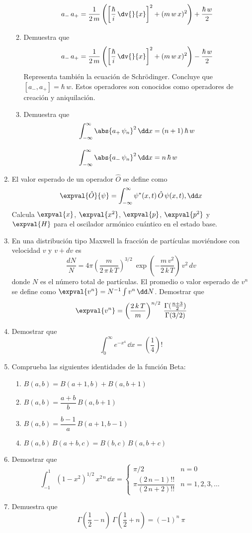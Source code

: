 \begin{enumerate}
\begin{enumerate}[label=\roman*)]
\[ a_{-} \, a_{+} = \dfrac{1}{2 \, m} \left( \left[ \dfrac{\hbar}{i} \, \dv{}{x} \right]^{2} + (m \, w \, x)^{2} \right) + \dfrac{\hbar \, w}{2} \]
\item Demuestra que
\[ a_{-} \, a_{+} = \dfrac{1}{2 \, m} \left( \left[ \dfrac{\hbar}{i} \, \dv{}{x} \right]^{2} + (m \, w \, x)^{2} \right) - \dfrac{\hbar \, w}{2} \]
Representa también la ecuación de Schrödinger. Concluye que $[a_{-}, a_{+}] = \hbar \, w$. Estos operadores son conocidos como operadores de creación y aniquilación.
\item Demuestra que
\begin{align*}
\int_{-\infty}^{\infty} \abs{a_{+} \, \psi_{n}}^{2} \, \dd x &= (n+1) \, \hbar \, w \\[1em]
\int_{-\infty}^{\infty} \abs{a_{-} \, \psi_{n}}^{2} \, \dd x &= n \, \hbar \, w
\end{align*}
\end{enumerate}
\item El valor esperado de un operador $\hat{O}$ se define como
\[ \expval{\hat{O}}{\psi} = \int_{-\infty}^{\infty} \psi^{*} (x, t) \, \hat{O} \, \psi (x, t) , \dd x  \]
Calcula $\expval{x}$, $\expval{x^{2}}$, $\expval{p}$, $\expval{p^{2}}$ y $\expval{H}$ para el oscilador armónico cuántico en el estado base.
\item En una distribución tipo Maxwell la fracción de partículas moviéndose con velocidad $v$ y $v+dv$ es
\[ \dfrac{dN}{N} = 4 \pi \left( \dfrac{m}{2 \, \pi \, k \, T} \right)^{3/2} \: \exp \left( - \dfrac{m \, v^{2}}{2 \, k \, T} \right) \, v^{2} \, dv \]
donde $N$ es el número total de partículas. El promedio o valor esperado de $v^{n}$ se define como $\expval{v^{n}} = N^{-1} \int v^{n} \, \dd N$. Demostrar que
\[ \expval{v^{n}} = \left( \dfrac{2 \, k \, T}{m} \right)^{n/2} \: \dfrac{\Gamma (\frac{n +3}{2})}{\Gamma (3/2)}\]
\item Demostrar que
\[ \int_{0}^{\infty} e^{-x^{4}} \, \dd x = \left( \dfrac{1}{4} \right) !\]
\item Comprueba las siguientes identidades de la función Beta:
\begin{enumerate}[label=\roman*)]
\setlength\itemsep{1em}
\item $B(a, b) = B(a+1, b) + B(a, b+1)$
\item $B(a, b) = \dfrac{a+b}{b} \, B(a, b+1)$ 
\item $B(a, b) = \dfrac{b-1}{a} \, B(a+1, b-1)$
\item $B(a, b) \, B(a+b, c) = B(b, c) \, B(a, b+c)$
\end{enumerate}
\item Demostrar que
\[ \int_{-1}^{1} (1-x^{2})^{1/2} \, x^{2 \, n} \, \dd x =  
\begin{cases}
\pi/2 & n = 0 \\[1em]
\pi \dfrac{(2 \, n-1)!!}{(2 \, n+2)!!} & n=1,2,3,\ldots  \end{cases}
 \]
\item Demuestra que 
\[ \Gamma(\frac{1}{2} - n) \: \Gamma(\frac{1}{2} + n) = (-1)^{n} \: \pi \]
\end{enumerate}
\vfill
\printbibliography  
